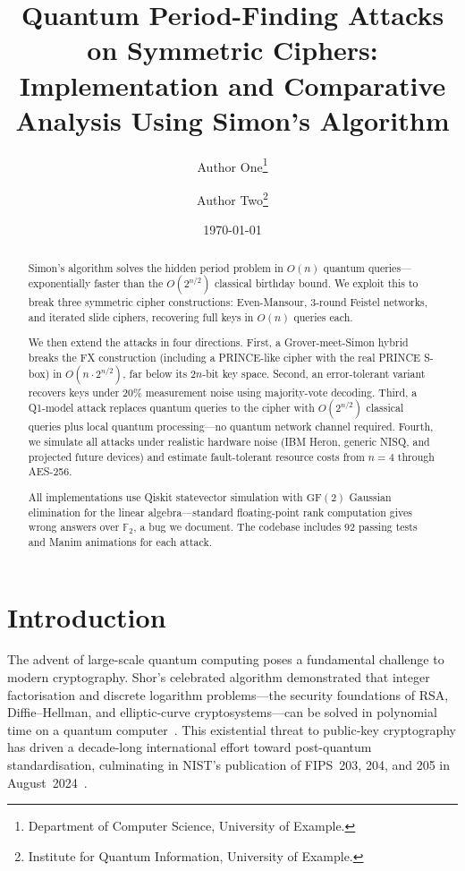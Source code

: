 \documentclass[11pt,a4paper]{article}
\title{Quantum Period-Finding Attacks on Symmetric Ciphers:\\
Implementation and Comparative Analysis Using Simon's Algorithm}
\author{
  Author One\thanks{Department of Computer Science, University of Example.}
  \and
  Author Two\thanks{Institute for Quantum Information, University of Example.}
}
\date{\today}
\begin{document}
\maketitle

\begin{abstract}
Simon's algorithm solves the hidden period problem in $O(n)$ quantum
queries---exponentially faster than the $O(2^{n/2})$ classical birthday
bound.  We exploit this to break three symmetric cipher constructions:
Even-Mansour, 3-round Feistel networks, and iterated slide ciphers,
recovering full keys in $O(n)$ queries each.

We then extend the attacks in four directions.  First, a
Grover-meet-Simon hybrid breaks the FX construction (including a
PRINCE-like cipher with the real PRINCE S-box) in $O(n \cdot 2^{n/2})$,
far below its $2n$-bit key space.  Second, an error-tolerant variant
recovers keys under 20\% measurement noise using majority-vote decoding.
Third, a Q1-model attack replaces quantum queries to the cipher with
$O(2^{n/2})$ classical queries plus local quantum processing---no
quantum network channel required.  Fourth, we simulate all attacks under
realistic hardware noise (IBM Heron, generic NISQ, and projected future
devices) and estimate fault-tolerant resource costs from $n=4$ through
AES-256.

All implementations use Qiskit statevector simulation with $\mathrm{GF}(2)$
Gaussian elimination for the linear algebra---standard floating-point
rank computation gives wrong answers over $\mathbb{F}_2$, a bug we
document.  The codebase includes 92 passing tests and Manim animations
for each attack.
\end{abstract}

\section{Introduction}

The advent of large-scale quantum computing poses a fundamental challenge
to modern cryptography.  Shor's celebrated algorithm demonstrated that
integer factorisation and discrete logarithm problems---the security
foundations of RSA, Diffie--Hellman, and elliptic-curve
cryptosystems---can be solved in polynomial time on a quantum
computer~\cite{Shor1997}.  This existential threat to public-key
cryptography has driven a decade-long international effort toward
post-quantum standardisation, culminating in NIST's publication of
FIPS~203, 204, and 205 in August~2024~\cite{NIST_PQC2024}.
\end{document}
